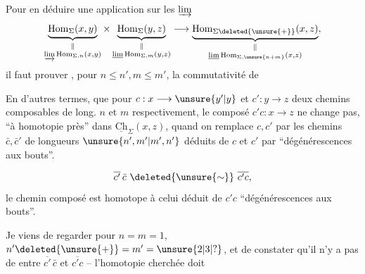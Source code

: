 Pour en déduire une application sur les $\varinjlim$
\[
\underbrace{\operatorname{Hom}_\Sigma(x,y)}_{\substack{\Vert\\\varinjlim\operatorname{Hom}_{\Sigma,n}(x,y)}}
\times\underbrace{\operatorname{Hom}_\Sigma(y,z)}_{\substack{\Vert\\\underline{\lim}\operatorname{Hom}_{\Sigma,m}(y,z)}}
\longrightarrow\underbrace{\operatorname{Hom}_{\Sigma\deleted{\unsure{+}}}(x,z)}_{\substack{\Vert\\\underline{\lim}\operatorname{Hom}_{\Sigma,\unsure{n+m}}(x,z)}},
\]
il faut prouver , pour $n\leq n',m\leq m'$, la commutativité de

En d'autres termes, que pour $c:x\longrightarrow \unsure{y'|y}$ et $c':y\longrightarrow z$ deux \inserted{$\Sigma$-}chemins composables de long. $n$ et $m$ respectivement, le composé  $c'c:x\longrightarrow z$ ne change pas, ``à homotopie près'' dans $\underline{\mathrm{Ch}}_\Sigma(x,z)$, quand on remplace $c,c'$ par les chemins $\bar c,\bar c'$ de longueurs $\unsure{n',m'|m',n'}$ déduits de $c$ et $c'$ par ``dégénérescences aux bouts''.

 
\[
\overline{c'}\,\bar c\ \deleted{\unsure{\sim}}\ \overline{c'c},
\]
le chemin composé est homotope à celui déduit de $c'c$  ``dégénérescences aux bouts''.

Je viens de regarder pour $n=m=1$, $n'\deleted{\unsure{+}}=m'=\unsure{2|3|?}$, et de constater qu'il n'y a pas de   entre $\overline{c'}\,\bar c$ et $\overline{c'c}$ -- l'homotopie cherchée doit

